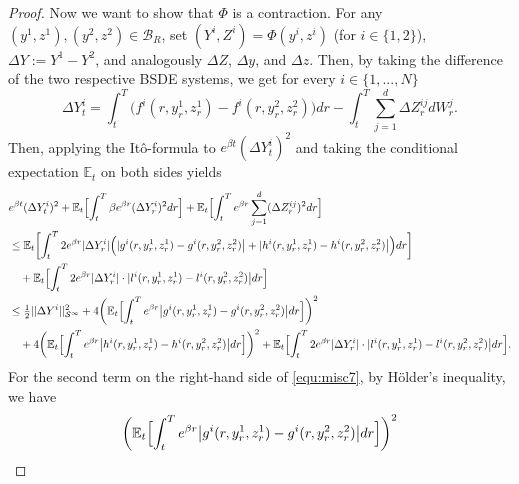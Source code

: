 \documentclass[10pt,a4paper]{article}
\theoremstyle{plain}
\theoremstyle{definition}
\numberwithin{equation}{section}
\begin{document}
\begin{proof}
Now we want to show that $\Phi$ is a contraction. For any  $(y^{1},z^{1}),(y^{2},z^{2}) \in \mathcal{B}_{R}$, set $(Y^{i},Z^{i}) = \Phi(y^{i},z^{i})$ (for $i \in \{1,2\}$), $\Delta Y := Y^{1}-Y^{2}$, and analogously $\Delta Z$, $\Delta y$, and $\Delta z$. Then, by taking the difference of the two respective BSDE systems, we get for every $i \in \{1,...,N\}$
\[
\Delta Y_{t}^{i} = \int_{t}^{T}\bigl(f^{i}(r,y_{r}^{1},z_{r}^{1})-f^{i}(r,y_{r}^{2},z_{r}^{2})\bigr)dr -\int_{t}^{T}\sum_{j=1}^{d}\Delta Z_{r}^{ij}dW_{r}^{j}.
\]
Then, applying the Itô-formula to $e^{\beta t}(\Delta Y_{t}^{i})^{2}$ and taking the conditional expectation $\mathbb{E}_{t}$ on both sides yields
\begin{align}
&e^{\beta t}(\Delta Y_{t}^{i})^{2} + \mathbb{E}_{t}\Bigl[\int_{t}^{T}\beta e^{\beta r}(\Delta Y_{r}^{i})^{2}dr\Bigr] + \mathbb{E}_{t}\Bigl[\int_{t}^{T}e^{\beta r}\sum_{j=1}^{d}(\Delta Z_{r}^{ij})^{2}dr\Bigr] \nonumber \\
&\leq \mathbb{E}_{t}\biggl[\int_{t}^{T}2e^{\beta r}|\Delta Y_{r}^{i}|\Bigl(|g^{i}(r,y_{r}^{1},z_{r}^{1})-g^{i}(r,y_{r}^{2},z_{r}^{2})\bigr| + |h^{i}(r,y_{r}^{1},z_{r}^{1})-h^{i}(r,y_{r}^{2},z_{r}^{2})\bigr|\Bigr)dr\biggr] \nonumber \\
&\ \ \ + \mathbb{E}_{t}\Bigl[\int_{t}^{T}2e^{\beta r}|\Delta Y_{r}^{i}|\cdot|l^{i}(r,y_{r}^{1},z_{r}^{1})-l^{i}(r,y_{r}^{2},z_{r}^{2})\bigr|dr\Bigr] \nonumber \\
&\leq \tfrac{1}{2}||\Delta Y^{i}||_{\mathcal{S}^{\infty}}^{2} + 4\biggl(\mathbb{E}_{t}\Bigl[\int_{t}^{T}e^{\beta r}\bigl|g^{i}(r,y_{r}^{1},z_{r}^{1})-g^{i}(r,y_{r}^{2},z_{r}^{2})\bigr|dr\Bigr]\biggr)^{2}  \label{equ:misc7} \\
& \ \ \ + 4\biggl(\mathbb{E}_{t}\Bigl[\int_{t}^{T}e^{\beta r}\bigl|h^{i}(r,y_{r}^{1},z_{r}^{1})-h^{i}(r,y_{r}^{2},z_{r}^{2})\bigr|dr\Bigr]\biggr)^{2} 
+ \mathbb{E}_{t}\Bigl[\int_{t}^{T}2e^{\beta r}|\Delta Y_{r}^{i}|\cdot|l^{i}(r,y_{r}^{1},z_{r}^{1})-l^{i}(r,y_{r}^{2},z_{r}^{2})\bigr|dr\Bigr]. \nonumber 
\end{align}
For the second term on the right-hand side of \eqref{equ:misc7}, by H\"older's inequality, we have
\begin{align*}\nonumber
&\biggl(\mathbb{E}_{t}\Bigl[\int_{t}^{T}e^{\beta r}\bigl|g^{i}(r,y_{r}^{1},z_{r}^{1})-g^{i}(r,y_{r}^{2},z_{r}^{2})\bigr|dr\Bigr]\biggr)^{2} \nonumber \\

\end{align*}
\end{proof}
\end{document}
